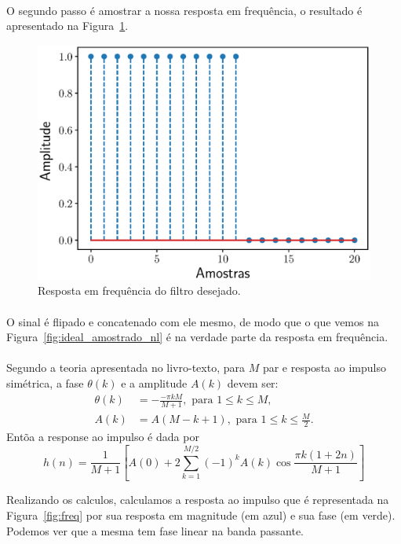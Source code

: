 \documentclass{homeworkclass}
\begin{document}
\begin{homeworkProblem}
\begin{homeworkSection}
\paragraph{}O segundo passo é amostrar a nossa resposta em frequência, o resultado é apresentado na Figura~\ref{fig:ideal_amostrado}.

\begin{figure}[!ht]
	\centering
	\includegraphics[width=0.6\linewidth]{figs/ideal_amostrado}
	\caption{Resposta em frequência do filtro desejado.}
	\label{fig:ideal_amostrado}
\end{figure}

\paragraph{}O sinal é flipado e concatenado com ele mesmo, de modo que o que vemos na Figura~\ref{fig:ideal_amostrado_nl} é na verdade parte da resposta em frequência.


\paragraph{}Segundo a teoria apresentada no livro-texto, para $M$ par e resposta ao impulso simétrica, a fase $\theta(k)$ e a amplitude $A(k)$ devem ser:
\begin{align*}
	\theta(k) &= - \frac{- \pi k M}{M+1}, \, \, \textrm{para} \, \, 1 \leq k \leq M, \\
	A(k) &= A(M-k+1), \, \, \textrm{para} \, \, 1 \leq k \leq \frac{M}{2}.
\end{align*}
Entõa a response ao impulso é dada por 
\begin{equation}
h(n) = \frac{1}{M+1}\left[A(0) + 2\sum_{k=1}^{M/2}(-1)^{k}A(k)\cos\frac{\pi k(1+ 2n)}{M+1}\right]
\end{equation}

Realizando os calculos, calculamos a resposta ao impulso que é representada na Figura~\ref{fig:freq} por sua resposta em magnitude (em azul) e sua fase (em verde). Podemos ver que a mesma tem fase linear na banda passante.


\end{homeworkSection}
\end{homeworkProblem}
\end{document}
